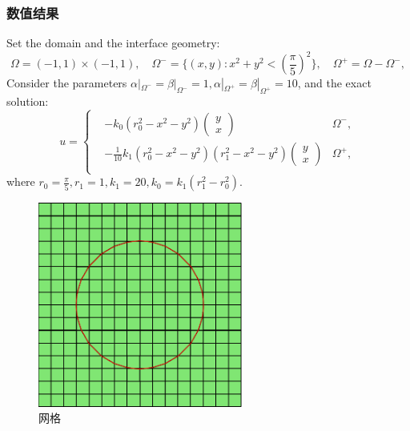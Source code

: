 \documentclass[notheorems,serif]{beamer}
\begin{document}
\begin{frame}
  \frametitle{数值结果}
  \begin{minipage}[b]{0.6\linewidth}
    Set the domain and the interface geometry:
    $$
    \Omega = (-1, 1)\times(-1, 1), \quad \Omega^- = \{(x, y) : x^2+y^2 <
\left(\frac{\pi}{5}\right)^2\},\quad \Omega^+ = \Omega - \Omega^-,
    $$
    Consider the parameters $\alpha|_{\Omega^-} = \beta|_{\Omega^-} = 1, 
    \alpha|_{\Omega^+} = \beta|_{\Omega^+} = 10$, and the exact solution:
    \small{
    $$
    {u} = \left\{
        \begin{aligned}
        & - k_0(r_0^2 - x^2 - y^2)
        \begin{pmatrix}
        y\\
        x
        \end{pmatrix} \quad& \Omega^-, \\
        &-\frac{1}{10}
        k_1(r_0^2 - x^2 - y^2)(r_1^2 - x^2 - y^2)
        \begin{pmatrix}
        y\\
        x
        \end{pmatrix}& \Omega^+, \\
        \end{aligned} 
    \right.
    $$
}
    where $r_0 = \frac{\pi}{5}, r_1 = 1, k_1 = 20, k_0 = k_1(r_1^2-r_0^2).$
\end{minipage}
\hfill
\begin{minipage}[b]{0.38\linewidth}
    \centering
    \begin{figure}[htpb]
        \centering
        \includegraphics[width=0.6\textwidth]{../figures/maxwell/convergence_test.pdf}
        \caption{网格}
    \end{figure}
\end{minipage}

\end{frame}
\end{document}

